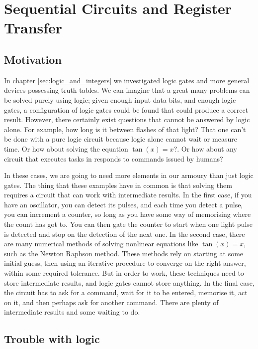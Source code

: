 \documentclass[../physical_computing.tex]{subfiles}
\begin{document}
\chapter{Sequential Circuits and Register Transfer}
\label{sec:registers}

\section{Motivation}
\label{sec:motivate_sequential}

In chapter \ref{sec:logic_and_integers} we investigated logic gates
and more general devices possessing truth tables. We can imagine 
that a great many problems can be solved purely using logic; given enough input data bits, and enough logic gates, a configuration of 
logic gates could be found that could produce a correct result. 
However, there certainly exist questions that cannot be answered by logic alone. For example, how long is it between flashes of that 
light? That one can't be done with a pure logic circuit because logic alone cannot wait or measure time. Or how about solving the equation $\tan(x)=x$?. Or how about any circuit that executes tasks in
responds to commands issued by humans?

In these cases, we are going to need more elements in our armoury than just logic gates. The thing that these examples have in common is that solving them requires a circuit that can work with intermediate results. In the first case, if you have an oscillator, you can detect its pulses, and each time you detect a pulse, you can increment a counter, so long as you have some way of memorising where the count has got to. You can then gate the counter to start when one light pulse is detected and stop on the detection of the next one. In the second case, there are many numerical methods of solving nonlinear equations like $\tan(x)=x$, such as the Newton Raphson method. These methods rely on starting at some initial guess, then using an iterative procedure to converge on the right answer, within some required tolerance. But in order to work, these techniques need to store intermediate results, and logic gates cannot store anything. In the final
case, the circuit has to ask for a command, wait for it to be entered, memorise it, act on it, and then perhaps ask for another command. There are plenty of intermediate results and some waiting to do.

\section{Trouble with logic}
\label{sec:trouble}
\end{document}
